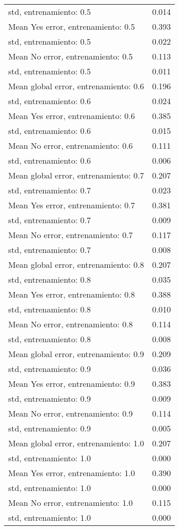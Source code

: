 \begin{longtable}{p{4cm}|p{1.5cm}}
std, entrenamiento: 0.5               &     0.014 \\
Mean Yes error, entrenamiento: 0.5    &     0.393 \\
std, entrenamiento: 0.5               &     0.022 \\
Mean No error, entrenamiento: 0.5     &     0.113 \\
std, entrenamiento: 0.5               &     0.011 \\
Mean global error, entrenamiento: 0.6 &     0.196 \\
std, entrenamiento: 0.6               &     0.024 \\
Mean Yes error, entrenamiento: 0.6    &     0.385 \\
std, entrenamiento: 0.6               &     0.015 \\
Mean No error, entrenamiento: 0.6     &     0.111 \\
std, entrenamiento: 0.6               &     0.006 \\
Mean global error, entrenamiento: 0.7 &     0.207 \\
std, entrenamiento: 0.7               &     0.023 \\
Mean Yes error, entrenamiento: 0.7    &     0.381 \\
std, entrenamiento: 0.7               &     0.009 \\
Mean No error, entrenamiento: 0.7     &     0.117 \\
std, entrenamiento: 0.7               &     0.008 \\
Mean global error, entrenamiento: 0.8 &     0.207 \\
std, entrenamiento: 0.8               &     0.035 \\
Mean Yes error, entrenamiento: 0.8    &     0.388 \\
std, entrenamiento: 0.8               &     0.010 \\
Mean No error, entrenamiento: 0.8     &     0.114 \\
std, entrenamiento: 0.8               &     0.008 \\
Mean global error, entrenamiento: 0.9 &     0.209 \\
std, entrenamiento: 0.9               &     0.036 \\
Mean Yes error, entrenamiento: 0.9    &     0.383 \\
std, entrenamiento: 0.9               &     0.009 \\
Mean No error, entrenamiento: 0.9     &     0.114 \\
std, entrenamiento: 0.9               &     0.005 \\
Mean global error, entrenamiento: 1.0 &     0.207 \\
std, entrenamiento: 1.0               &     0.000 \\
Mean Yes error, entrenamiento: 1.0    &     0.390 \\
std, entrenamiento: 1.0               &     0.000 \\
Mean No error, entrenamiento: 1.0     &     0.115 \\
std, entrenamiento: 1.0               &     0.000 \\
\end{longtable}
